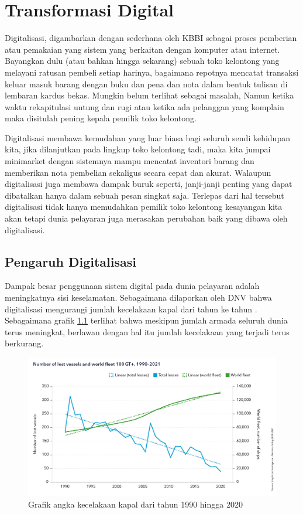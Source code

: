 \chapter{Transformasi Digital}
\label{ch:transformasi-digital}

Digitalisasi, digambarkan dengan sederhana oleh KBBI sebagai proses pemberian atau pemakaian yang sistem yang berkaitan dengan komputer atau internet. Bayangkan dulu (atau bahkan hingga sekarang) sebuah toko kelontong yang melayani ratusan pembeli setiap harinya, bagaimana repotnya mencatat transaksi keluar masuk barang dengan buku dan pena dan nota dalam bentuk tulisan di lembaran kardus bekas. Mungkin belum terlihat sebagai masalah, Namun ketika waktu rekapitulasi untung dan rugi atau ketika ada pelanggan yang komplain maka disitulah pening kepala pemilik toko kelontong.

Digitalisasi membawa kemudahan yang luar biasa bagi seluruh sendi kehidupan kita, jika dilanjutkan pada lingkup toko kelontong tadi, maka kita jumpai minimarket dengan sistemnya mampu mencatat inventori barang dan memberikan nota pembelian sekaligus secara cepat dan akurat. Walaupun digitalisasi juga membawa dampak buruk seperti, janji-janji penting yang dapat dibatalkan hanya dalam sebuah pesan singkat saja. Terlepas dari hal tersebut digitalisasi tidak hanya memudahkan pemilik toko kelontong kesayangan kita akan tetapi dunia pelayaran juga merasakan perubahan baik yang dibawa oleh digitalisasi.

\section{Pengaruh Digitalisasi}
\label{sec:pengaruh-digitalisasi}

Dampak besar penggunaan sistem digital pada dunia pelayaran adalah meningkatnya sisi keselamatan. Sebagaimana dilaporkan oleh DNV bahwa digitalisasi mengurangi jumlah kecelakaan kapal dari tahun ke tahun \citep{Valderhaug_Goksoyr_2022}. Sebagaimana grafik \ref{fig:pengurangan-kecelakaan-kapal} terlihat bahwa meskipun jumlah armada seluruh dunia terus meningkat, berlawan dengan hal itu jumlah kecelakaan yang terjadi terus berkurang.
\begin{figure}[!htbp]
    \centering
    \includegraphics[width=0.65\linewidth]{images/number_of_lost_vessels.jpg.jpg}
    \caption{Grafik angka kecelakaan kapal dari tahun 1990 hingga 2020}
    \label{fig:pengurangan-kecelakaan-kapal}
\end{figure}


